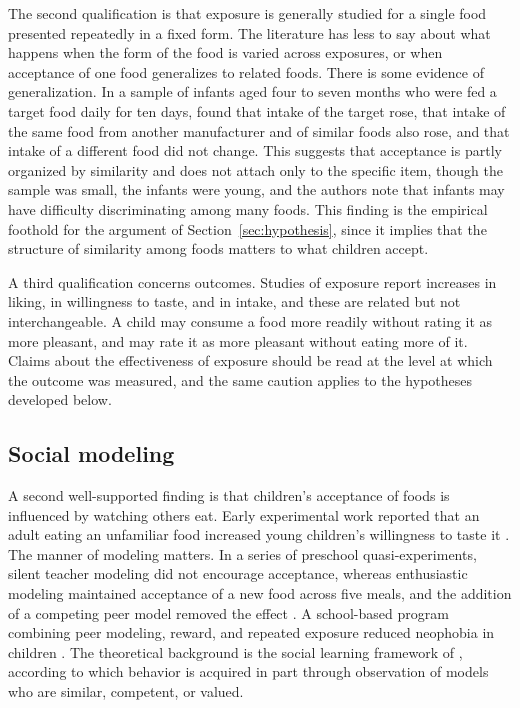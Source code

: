 \documentclass[11pt]{article}
\theoremstyle{remark}
\begin{document}
The second qualification is that exposure is generally studied for a single food presented repeatedly in a fixed form. The literature has less to say about what happens when the form of the food is varied across exposures, or when acceptance of one food generalizes to related foods. There is some evidence of generalization. In a sample of infants aged four to seven months who were fed a target food daily for ten days, \citet{birch1998infants} found that intake of the target rose, that intake of the same food from another manufacturer and of similar foods also rose, and that intake of a different food did not change. This suggests that acceptance is partly organized by similarity and does not attach only to the specific item, though the sample was small, the infants were young, and the authors note that infants may have difficulty discriminating among many foods. This finding is the empirical foothold for the argument of Section~\ref{sec:hypothesis}, since it implies that the structure of similarity among foods matters to what children accept.

A third qualification concerns outcomes. Studies of exposure report increases in liking, in willingness to taste, and in intake, and these are related but not interchangeable. A child may consume a food more readily without rating it as more pleasant, and may rate it as more pleasant without eating more of it. Claims about the effectiveness of exposure should be read at the level at which the outcome was measured, and the same caution applies to the hypotheses developed below.

\subsection{Social modeling}

A second well-supported finding is that children's acceptance of foods is influenced by watching others eat. Early experimental work reported that an adult eating an unfamiliar food increased young children's willingness to taste it \citep{harper1975effect}. The manner of modeling matters. In a series of preschool quasi-experiments, silent teacher modeling did not encourage acceptance, whereas enthusiastic modeling maintained acceptance of a new food across five meals, and the addition of a competing peer model removed the effect \citep{hendy2000effectiveness}. A school-based program combining peer modeling, reward, and repeated exposure reduced neophobia in children \citep{laureati2014school}. The theoretical background is the social learning framework of \citet{bandura1977social}, according to which behavior is acquired in part through observation of models who are similar, competent, or valued.
\end{document}

